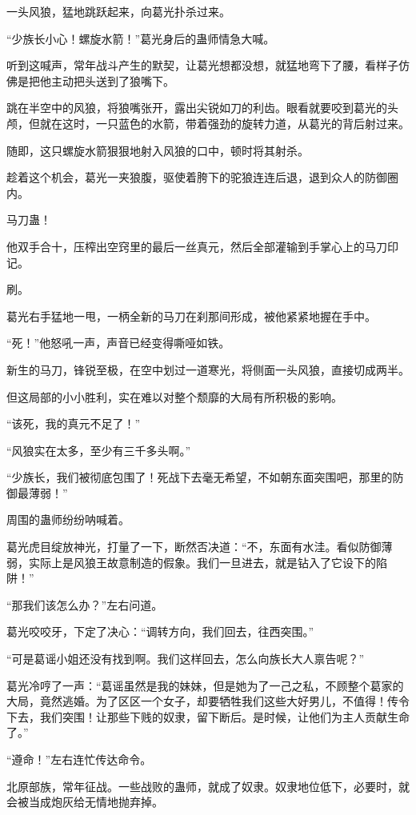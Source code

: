 \begin{this_body}
一头风狼，猛地跳跃起来，向葛光扑杀过来。

“少族长小心！螺旋水箭！”葛光身后的蛊师情急大喊。

听到这喊声，常年战斗产生的默契，让葛光想都没想，就猛地弯下了腰，看样子仿佛是把他主动把头送到了狼嘴下。

跳在半空中的风狼，将狼嘴张开，露出尖锐如刀的利齿。眼看就要咬到葛光的头颅，但就在这时，一只蓝色的水箭，带着强劲的旋转力道，从葛光的背后射过来。

随即，这只螺旋水箭狠狠地射入风狼的口中，顿时将其射杀。

趁着这个机会，葛光一夹狼腹，驱使着胯下的驼狼连连后退，退到众人的防御圈内。

马刀蛊！

他双手合十，压榨出空窍里的最后一丝真元，然后全部灌输到手掌心上的马刀印记。

刷。

葛光右手猛地一甩，一柄全新的马刀在刹那间形成，被他紧紧地握在手中。

“死！”他怒吼一声，声音已经变得嘶哑如铁。

新生的马刀，锋锐至极，在空中划过一道寒光，将侧面一头风狼，直接切成两半。

但这局部的小小胜利，实在难以对整个颓靡的大局有所积极的影响。

“该死，我的真元不足了！”

“风狼实在太多，至少有三千多头啊。”

“少族长，我们被彻底包围了！死战下去毫无希望，不如朝东面突围吧，那里的防御最薄弱！”

周围的蛊师纷纷呐喊着。

葛光虎目绽放神光，打量了一下，断然否决道：“不，东面有水洼。看似防御薄弱，实际上是风狼王故意制造的假象。我们一旦进去，就是钻入了它设下的陷阱！”

“那我们该怎么办？”左右问道。

葛光咬咬牙，下定了决心：“调转方向，我们回去，往西突围。”

“可是葛谣小姐还没有找到啊。我们这样回去，怎么向族长大人禀告呢？”

葛光冷哼了一声：“葛谣虽然是我的妹妹，但是她为了一己之私，不顾整个葛家的大局，竟然逃婚。为了区区一个女子，却要牺牲我们这些大好男儿，不值得！传令下去，我们突围！让那些下贱的奴隶，留下断后。是时候，让他们为主人贡献生命了。”

“遵命！”左右连忙传达命令。

北原部族，常年征战。一些战败的蛊师，就成了奴隶。奴隶地位低下，必要时，就会被当成炮灰给无情地抛弃掉。


\end{this_body}
